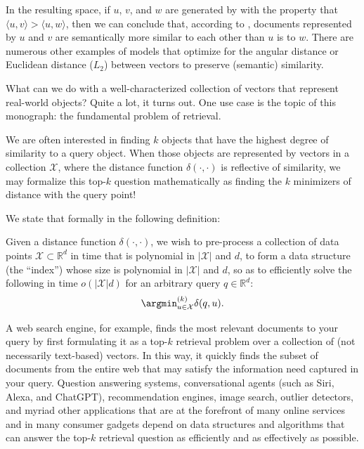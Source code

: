 In the resulting space, if $u$, $v$, and $w$ are generated by \splade{}
with the property that $\langle u, v \rangle > \langle u, w \rangle$, then we can conclude
that, according to \splade{}, documents represented by $u$ and $v$ are semantically more
similar to each other than $u$ is to $w$.
There are numerous other examples of models that optimize for the angular distance
or Euclidean distance ($L_2$) between vectors to preserve (semantic) similarity.

\bigskip

What can we do with a well-characterized collection of vectors that represent real-world
objects? Quite a lot, it turns out. One use case is the topic of this monograph:
the fundamental problem of retrieval.

\begin{svgraybox}
We are often interested in finding $k$ objects that have the highest
degree of similarity to a query object.
When those objects are represented by vectors in a collection $\mathcal{X}$,
where the distance function $\delta(\cdot, \cdot)$ is reflective of similarity,
we may formalize this top-$k$ question mathematically as finding the $k$
minimizers of distance with the query point!
\end{svgraybox}

We state that formally in the following definition:

\begin{definition}
\label{definition:flavors:top-k-retrieval}
Given a distance function $\delta(\cdot, \cdot)$, we wish to pre-process
a collection of data points $\mathcal{X} \subset \mathbb{R}^d$
in time that is polynomial in $\lvert \mathcal{X} \rvert$ and $d$,
to form a data structure (the ``index'') whose size is polynomial in
$\lvert \mathcal{X} \rvert$ and $d$, so as to efficiently solve
the following in time $o(\lvert \mathcal{X} \rvert d)$
for an arbitrary query $q \in \mathbb{R}^d$:
\begin{equation}
    \label{equation:flavors:top-k-retrieval}
    \argmin^{(k)}_{u \in \mathcal{X}} \delta(q, u).
\end{equation}
\end{definition}

A web search engine, for example, finds the most relevant documents to your
query by first formulating it as a top-$k$ retrieval problem
over a collection of (not necessarily text-based) vectors.
In this way, it quickly finds the subset of documents from the entire web that
may satisfy the information need captured in your query.
Question answering systems, conversational agents (such as Siri, Alexa, and ChatGPT),
recommendation engines, image search, outlier detectors,
and myriad other applications that are at the forefront
of many online services and in many consumer gadgets
depend on data structures and algorithms that can
answer the top-$k$ retrieval question as efficiently and as effectively as possible.

